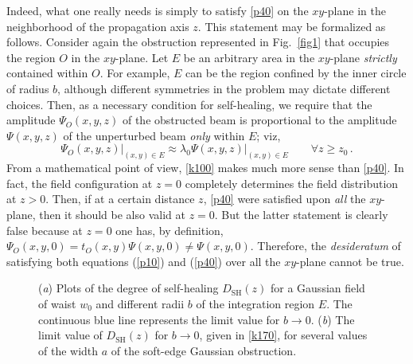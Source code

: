 \documentclass[10pt]{article}
\newcommand{\sugg}[1]{{#1}}
\begin{document}
Indeed, what one really needs is simply to satisfy \eqref{p40} on the
$xy$-plane in the neighborhood of the propagation axis $z$. This
statement may be formalized as follows.  Consider again the
obstruction represented in Fig.~\ref{fig1} that occupies the region
$O$ in the $xy$-plane.  Let $E$ be an arbitrary area in the $xy$-plane
\emph{strictly} contained within $O$. For example, $E$ can be the
region confined by the inner circle of radius $b$, although different
symmetries in the problem may dictate different choices.  Then, as
a necessary condition for self-healing, we require that the amplitude
$\Psi_O(x,y,z)$ of the obstructed beam is proportional to the
amplitude $\Psi(x,y,z)$ of the unperturbed beam \emph{only} within
$E$; viz,
\begin{equation}
  \label{k100}
  \Psi_O(x,y,z ) \Big|_{(x,y) \in E} \approx \lambda_0 \Psi (x,y,z)
  \Big|_{(x,y) \in E} 
  \qquad 
  \forall z \geq z_0 \, .
\end{equation}
From a mathematical point of view, \eqref{k100} makes much more sense
than \eqref{p40}. In fact, the field configuration at $z =0$
completely determines the field distribution at $z>0$. Then, if at a
certain distance $z$, \eqref{p40} were satisfied upon \emph{all} the
$xy$-plane, then it should be also valid at $z=0$. But the latter
statement is clearly false because at $z=0$ one has, by definition,
\sugg{$\Psi_O(x,y,0 ) = t_O(x,y) \Psi (x,y,0) \neq \Psi (x,y,0)$.}
Therefore, the \emph{desideratum} of satisfying both equations
(\ref{p10}) and (\ref{p40}) over all the $xy$-plane cannot be true.

\begin{figure}[t]
  \caption{\label{fig4} (\emph{a}) Plots of the degree of self-healing
    $D_{\mathrm{SH}}  (z)$ for a Gaussian field of waist $w_0$ and different
    radii $b$ of the integration region $E$. The continuous blue line
    represents the limit value for $b \to 0$.  (\emph{b}) The
    limit value of  $D_{\mathrm{SH}}  (z)$  for  $b \to 0$, given in
    \eqref{k170},  for several  values of the width $a$ of the
    soft-edge Gaussian  obstruction.}
\end{figure}
\end{document}
